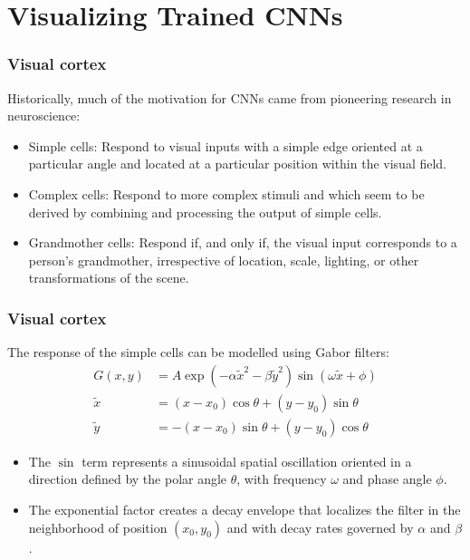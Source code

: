 \documentclass{beamer}
\begin{document}
\section{Visualizing Trained CNNs}

\begin{frame}
    \frametitle{Visual cortex}
    Historically, much of the motivation for CNNs came from pioneering research in neuroscience:
    \begin{itemize}
        \item Simple cells: Respond to visual inputs with a simple edge oriented at a particular angle and located at a particular position within the visual field.
        \item Complex cells: Respond to more complex stimuli and which seem to be derived by combining and processing the output of simple cells.
        \item Grandmother cells: Respond if, and only if, the visual input corresponds to a person's grandmother, irrespective of location, scale, lighting, or other transformations of the scene.
    \end{itemize}
\end{frame}

\begin{frame}
    \frametitle{Visual cortex}
    The response of the simple cells can be modelled using Gabor filters:
    \begin{align*}
        G(x,y)&=A\exp(-\alpha\tilde{x}^{2}-\beta\tilde{y}^{2})\sin(\omega\tilde{x}+\phi) \\
        \tilde{x}&=(x-x_{0})\cos\theta+(y-y_{0})\sin\theta \\
        \tilde{y}&=-(x-x_{0})\sin\theta+(y-y_{0})\cos\theta
    \end{align*}
    \begin{itemize}
        \item The $\sin$ term represents a sinusoidal spatial oscillation oriented in a direction defined by the polar angle $\theta$, with frequency $\omega$ and phase angle $\phi$.
        \item The exponential factor creates a decay envelope that localizes the filter in the neighborhood of position $(x_{0},y_{0})$ and with decay rates governed by $\alpha$ and $\beta$.
    \end{itemize}
\end{frame}
\end{document}
